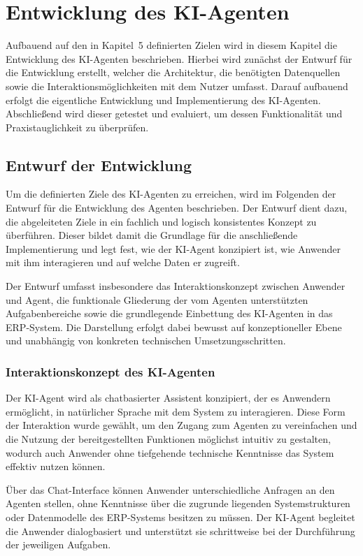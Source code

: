 \section{Entwicklung des KI-Agenten}
Aufbauend auf den in Kapitel~5 definierten Zielen wird in diesem Kapitel die Entwicklung des \ac{KI}-Agenten beschrieben. Hierbei wird zunächst der Entwurf für die Entwicklung erstellt, welcher die Architektur, die benötigten Datenquellen sowie die Interaktionsmöglichkeiten mit dem Nutzer umfasst. Darauf aufbauend erfolgt die eigentliche Entwicklung und Implementierung des \ac{KI}-Agenten. Abschließend wird dieser getestet und evaluiert, um dessen Funktionalität und Praxistauglichkeit zu überprüfen.


\subsection{Entwurf der Entwicklung}
Um die definierten Ziele des \ac{KI}-Agenten zu erreichen, wird im Folgenden der Entwurf für die Entwicklung des Agenten beschrieben. Der Entwurf dient dazu, die abgeleiteten Ziele in ein fachlich und logisch konsistentes Konzept zu überführen. Dieser bildet damit die Grundlage für die anschließende Implementierung und legt fest, wie der \ac{KI}-Agent konzipiert ist, wie Anwender mit ihm interagieren und auf welche Daten er zugreift.

Der Entwurf umfasst insbesondere das Interaktionskonzept zwischen Anwender und Agent, die funktionale Gliederung der vom Agenten unterstützten Aufgabenbereiche sowie die grundlegende Einbettung des \ac{KI}-Agenten in das \ac{ERP}-System. Die Darstellung erfolgt dabei bewusst auf konzeptioneller Ebene und unabhängig von konkreten technischen Umsetzungsschritten.

\subsubsection{Interaktionskonzept des KI-Agenten}

Der \ac{KI}-Agent wird als chatbasierter Assistent konzipiert, der es Anwendern ermöglicht, in natürlicher Sprache mit dem System zu interagieren. Diese Form der Interaktion wurde gewählt, um den Zugang zum Agenten zu vereinfachen und die Nutzung der bereitgestellten Funktionen möglichst intuitiv zu gestalten, wodurch auch Anwender ohne tiefgehende technische Kenntnisse das System effektiv nutzen können.

Über das Chat-Interface können Anwender unterschiedliche Anfragen an den Agenten stellen, ohne Kenntnisse über die zugrunde liegenden Systemstrukturen oder Datenmodelle des \ac{ERP}-Systems besitzen zu müssen. Der \ac{KI}-Agent begleitet die Anwender dialogbasiert und unterstützt sie schrittweise bei der Durchführung der jeweiligen Aufgaben.

